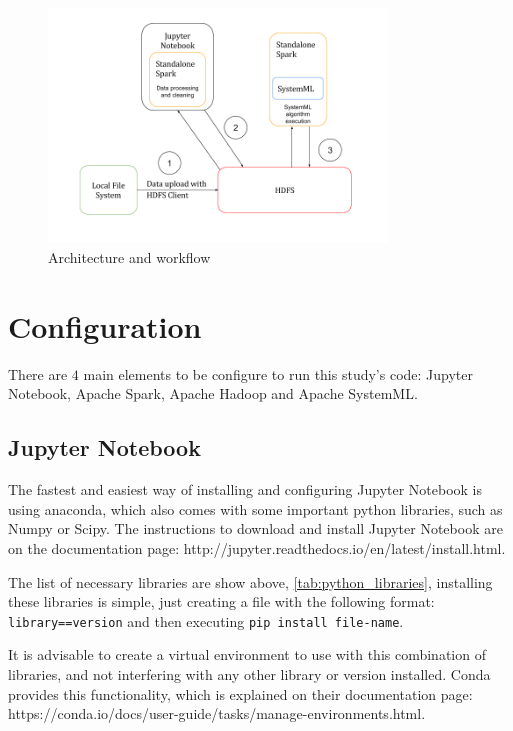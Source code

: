 \documentclass[11pt]{book} %
\newcommand{\code}[1]{\colorbox{codegray}{\texttt{#1}}}
\begin{document}
    \begin{figure}
      \includegraphics[width=0.8\textwidth]{study_architecture.png}
      \caption{Architecture and workflow}
      \label{img:architecture_workflow}
    \end{figure}

  \section{Configuration}

    There are $4$ main elements to be configure to run this study's code: Jupyter Notebook, Apache Spark, Apache Hadoop and Apache SystemML.

    \subsection{Jupyter Notebook}

      The fastest and easiest way of installing and configuring Jupyter Notebook is using anaconda, which also comes with some important python libraries, such as Numpy or Scipy. The instructions to download and install Jupyter Notebook are on the documentation page: http://jupyter.readthedocs.io/en/latest/install.html.

      The list of necessary libraries are show above, \ref{tab:python_libraries}, installing these libraries is simple, just creating a file with the following format: \code{library==version} and then executing \code{pip install file-name}.

      It is advisable to create a virtual environment to use with this combination of libraries, and not interfering with any other library or version installed. Conda provides this functionality, which is explained on their documentation page: https://conda.io/docs/user-guide/tasks/manage-environments.html.
\end{document}

